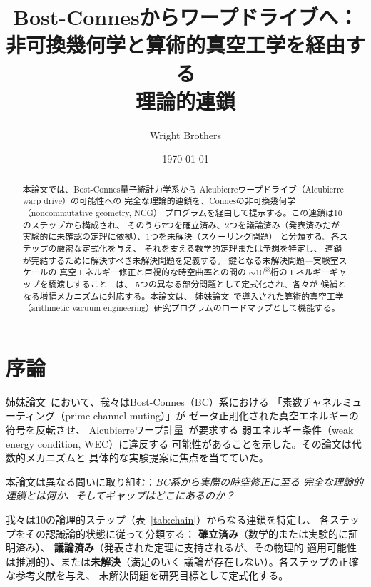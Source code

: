 \documentclass[11pt,a4paper]{article}
\begin{document}
\title{Bost-Connesからワープドライブへ：\\
  非可換幾何学と算術的真空工学を経由する\\
  理論的連鎖}

\author{Wright Brothers}
\date{\today}

\begin{abstract}
本論文では、Bost-Connes量子統計力学系から
Alcubierreワープドライブ（Alcubierre warp drive）の可能性への
完全な理論的連鎖を、Connesの非可換幾何学（noncommutative geometry, NCG）
プログラムを経由して提示する。この連鎖は10のステップから構成され、
そのうち7つを確立済み、2つを議論済み（発表済みだが
実験的に未確認の定理に依拠）、1つを未解決（スケーリング問題）
と分類する。各ステップの厳密な定式化を与え、
それを支える数学的定理または予想を特定し、
連鎖が完結するために解決すべき未解決問題を定義する。
鍵となる未解決問題---実験室スケールの
真空エネルギー修正と巨視的な時空曲率との間の
$\sim 10^{68}$桁のエネルギーギャップを橋渡しすること---は、
5つの異なる部分問題として定式化され、各々が
候補となる増幅メカニズムに対応する。本論文は、
姉妹論文~\cite{paper_A}で導入された算術的真空工学
（arithmetic vacuum engineering）研究プログラムのロードマップとして機能する。
\end{abstract}

\maketitle

\section{序論}
\label{sec:intro}

姉妹論文~\cite{paper_A}において、我々はBost-Connes（BC）系における
「素数チャネルミューティング（prime channel muting）」が
ゼータ正則化された真空エネルギーの符号を反転させ、
Alcubierreワープ計量~\cite{Alcubierre1994}が要求する
弱エネルギー条件（weak energy condition, WEC）に違反する
可能性があることを示した。その論文は代数的メカニズムと
具体的な実験提案に焦点を当てていた。

本論文は異なる問いに取り組む：\emph{BC系から実際の時空修正に至る
完全な理論的連鎖とは何か、そしてギャップはどこにあるのか？}

我々は10の論理的ステップ（表~\ref{tab:chain}）からなる連鎖を特定し、
各ステップをその認識論的状態に従って分類する：
\textbf{確立済み}（数学的または実験的に証明済み）、
\textbf{議論済み}（発表された定理に支持されるが、その物理的
適用可能性は推測的）、または\textbf{未解決}（満足のいく
議論が存在しない）。各ステップの正確な参考文献を与え、
未解決問題を研究目標として定式化する。
\end{document}
